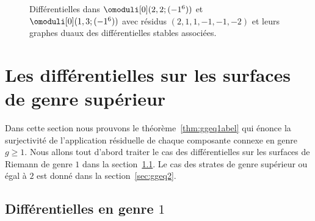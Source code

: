 \begin{ex}
\begin{figure}[htb]
\caption{Différentielles dans $\omoduli[0](2,2;(-1^6))$ et $\omoduli[0](1,3;(-1^6))$ avec résidus $(2,1,1,-1,-1,-2)$ et leurs graphes duaux des différentielles stables associées.} \label{fig:graphdeliant}
\end{figure}

\end{ex}

\section{Les différentielles sur les surfaces de genre supérieur}
\label{sec:ggeq1}

Dans cette section nous prouvons le théorème~\ref{thm:ggeq1abel} qui énonce la surjectivité de l'application résiduelle de chaque composante connexe en genre $g\geq1$.
Nous allons tout d'abord traiter le cas des différentielles sur les surfaces de Riemann de genre $1$ dans la section~\ref{sec:g1}. Le cas des strates de genre supérieur ou égal à $2$ est donné dans la section~\ref{sec:ggeq2}.

\subsection{Différentielles en genre $1$}
\label{sec:g1}

